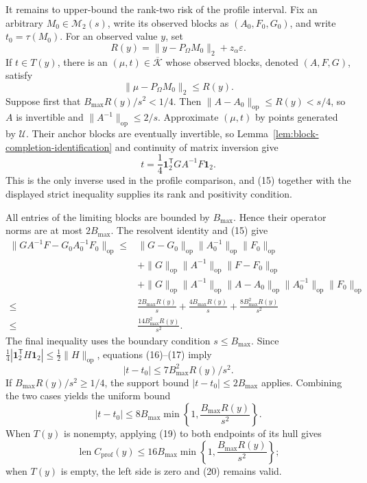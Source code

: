 It remains to upper-bound the rank-two risk of the profile interval.  Fix an arbitrary \(M_0\in\mathcal M_2(s)\), write its observed blocks as \((A_0,F_0,G_0)\), and write \(t_0=\tau(M_0)\).  For an observed value \(y\), set
\[
 R(y)=\lVert y-P_\Omega M_0\rVert_2+z_\alpha\varepsilon.
\tag{14}
\]
If \(t\in T(y)\), there is an \((\mu,t)\in\overline{\mathcal K}\) whose observed blocks, denoted \((A,F,G)\), satisfy
\[
 \lVert\mu-P_\Omega M_0\rVert_2\leq R(y).
\tag{15}
\]
Suppose first that \(B_{\max}R(y)/s^2<1/4\).  Then
\(\lVert A-A_0\rVert_{\mathrm{op}}\leq R(y)<s/4\), so \(A\) is invertible and \(\lVert A^{-1}\rVert_{\mathrm{op}}\leq2/s\).  Approximate \((\mu,t)\) by points generated by \(\mathcal U\).  Their anchor blocks are eventually invertible, so Lemma~\ref{lem:block-completion-identification} and continuity of matrix inversion give
\[
 t=\frac14\mathbf1_2^{\mathsf T}GA^{-1}F\mathbf1_2.
\tag{16}
\]
This is the only inverse used in the profile comparison, and (15) together with the displayed strict inequality supplies its rank and positivity condition.

All entries of the limiting blocks are bounded by \(B_{\max}\).  Hence their operator norms are at most \(2B_{\max}\).  The resolvent identity and (15) give
\[
\begin{split}
 \lVert GA^{-1}F-G_0A_0^{-1}F_0\rVert_{\mathrm{op}}
 \leq{}&\lVert G-G_0\rVert_{\mathrm{op}}\lVert A_0^{-1}\rVert_{\mathrm{op}}\lVert F_0\rVert_{\mathrm{op}}\\
 &+\lVert G\rVert_{\mathrm{op}}\lVert A^{-1}\rVert_{\mathrm{op}}\lVert F-F_0\rVert_{\mathrm{op}}\\
 &+\lVert G\rVert_{\mathrm{op}}\lVert A^{-1}\rVert_{\mathrm{op}}
 \lVert A-A_0\rVert_{\mathrm{op}}\lVert A_0^{-1}\rVert_{\mathrm{op}}
 \lVert F_0\rVert_{\mathrm{op}}\\
 \leq{}&\frac{2B_{\max}R(y)}s+\frac{4B_{\max}R(y)}s
 +\frac{8B_{\max}^2R(y)}{s^2}\\
 \leq{}&\frac{14B_{\max}^2R(y)}{s^2}.
\end{split}
\tag{17}
\]
The final inequality uses the boundary condition \(s\leq B_{\max}\).  Since
\(\tfrac14|\mathbf1_2^{\mathsf T}H\mathbf1_2|\leq\tfrac12\lVert H\rVert_{\mathrm{op}}\), equations (16)--(17) imply
\[
 |t-t_0|\leq7B_{\max}^2R(y)/s^2.
\tag{18}
\]
If \(B_{\max}R(y)/s^2\geq1/4\), the support bound
\(|t-t_0|\leq2B_{\max}\) applies.  Combining the two cases yields the uniform bound
\[
 |t-t_0|\leq8B_{\max}
 \min\left\{1,\frac{B_{\max}R(y)}{s^2}\right\}.
\tag{19}
\]
When \(T(y)\) is nonempty, applying (19) to both endpoints of its hull gives
\[
 \operatorname{len}C_{\mathrm{prof}}(y)
 \leq16B_{\max}
 \min\left\{1,\frac{B_{\max}R(y)}{s^2}\right\};
\tag{20}
\]
when \(T(y)\) is empty, the left side is zero and (20) remains valid.

